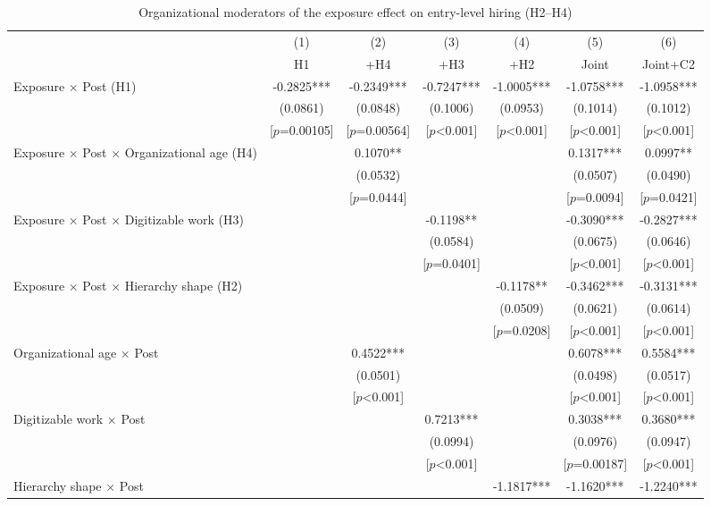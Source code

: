 \begin{table}[!htbp]\centering\footnotesize\setlength{\tabcolsep}{4pt}
\caption{Organizational moderators of the exposure effect on entry-level hiring (H2--H4)}\label{tab:moderation}
\begin{tabular*}{\linewidth}{@{\extracolsep{\fill}}lcccccc@{}}
\toprule
 & (1) & (2) & (3) & (4) & (5) & (6) \\
 & H1 & +H4 & +H3 & +H2 & Joint & Joint+C2 \\
\midrule
Exposure $\times$ Post (H1) & -0.2825*** & -0.2349*** & -0.7247*** & -1.0005*** & -1.0758*** & -1.0958*** \\
 & (0.0861) & (0.0848) & (0.1006) & (0.0953) & (0.1014) & (0.1012) \\
 & [$p$=0.00105] & [$p$=0.00564] & [$p$<0.001] & [$p$<0.001] & [$p$<0.001] & [$p$<0.001] \\
Exposure $\times$ Post $\times$ Organizational age (H4) &  & 0.1070** &  &  & 0.1317*** & 0.0997** \\
 &  & (0.0532) &  &  & (0.0507) & (0.0490) \\
 &  & [$p$=0.0444] &  &  & [$p$=0.0094] & [$p$=0.0421] \\
Exposure $\times$ Post $\times$ Digitizable work (H3) &  &  & -0.1198** &  & -0.3090*** & -0.2827*** \\
 &  &  & (0.0584) &  & (0.0675) & (0.0646) \\
 &  &  & [$p$=0.0401] &  & [$p$<0.001] & [$p$<0.001] \\
Exposure $\times$ Post $\times$ Hierarchy shape (H2) &  &  &  & -0.1178** & -0.3462*** & -0.3131*** \\
 &  &  &  & (0.0509) & (0.0621) & (0.0614) \\
 &  &  &  & [$p$=0.0208] & [$p$<0.001] & [$p$<0.001] \\
Organizational age $\times$ Post &  & 0.4522*** &  &  & 0.6078*** & 0.5584*** \\
 &  & (0.0501) &  &  & (0.0498) & (0.0517) \\
 &  & [$p$<0.001] &  &  & [$p$<0.001] & [$p$<0.001] \\
Digitizable work $\times$ Post &  &  & 0.7213*** &  & 0.3038*** & 0.3680*** \\
 &  &  & (0.0994) &  & (0.0976) & (0.0947) \\
 &  &  & [$p$<0.001] &  & [$p$=0.00187] & [$p$<0.001] \\
Hierarchy shape $\times$ Post &  &  &  & -1.1817*** & -1.1620*** & -1.2240*** \\

\end{tabular*}
\end{table}
